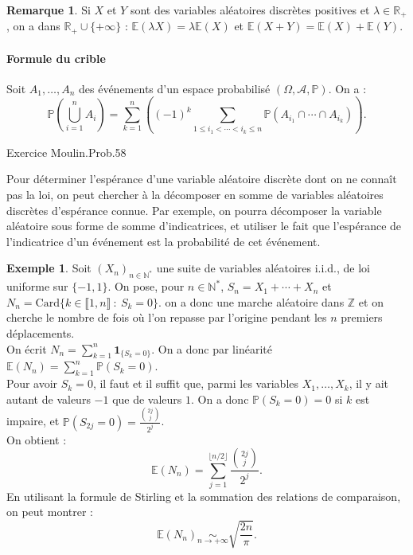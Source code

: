 \documentclass[french]{article}
\renewcommand{\P}{\mathbb{P}}
\newcommand{\N}{\mathbb{N}}
\newcommand{\Z}{\mathbb{Z}}
\newcommand{\R}{\mathbb{R}}
\newcommand{\st}{^*}
\newcommand{\E}{\mathbb{E}}
\newcommand{\card}{\text{Card}}
\theoremstyle{plain}
\theoremstyle{definition}
\newtheorem*{ex}{Exemple}
\newtheorem*{rmq}{Remarque}
\theoremstyle{remark}
\begin{document}
\begin{rmq}
	Si $X$ et $Y$ sont des variables aléatoires discrètes positives et $\lambda\in\R_+$, on a dans $\R_+\cup\{+\infty\}$ : $\E(\lambda X)=\lambda\E(X)$ et $\E(X+Y)=\E(X)+\E(Y)$.
\end{rmq}

\paragraph{Formule du crible}
Soit $A_1,\ldots,A_n$ des événements d'un espace probabilisé $(\Omega,\mathcal{A},\P)$. On a :
$$\P\left(\bigcup_{i=1}^nA_i\right)=\sum_{k=1}^{n}\left((-1)^k\sum_{1\leqslant i_1<\cdots<i_k\leqslant n}\P(A_{i_1}\cap\cdots\cap A_{i_k})\right).$$

Exercice Moulin.Prob.58

\begin{met}
	Pour déterminer l'espérance d'une variable aléatoire discrète dont on ne connaît pas la loi, on peut chercher à la décomposer en somme de variables aléatoires discrètes d'espérance connue. Par exemple, on pourra décomposer la variable aléatoire sous forme de somme d'indicatrices, et utiliser le fait que l'espérance de l'indicatrice d'un événement est la probabilité de cet événement.
\end{met}

\begin{ex}
	Soit $(X_n)_{n\in\N\st}$ une suite de variables aléatoires i.i.d., de loi uniforme sur $\{-1,1\}$. On pose, pour $n\in\N\st$, $S_n=X_1+\cdots+X_n$ et $N_n=\card\{k\in\llbracket1,n\rrbracket\ : \ S_k=0\}$. on a donc une marche aléatoire dans $\Z$ et on cherche le nombre de fois où l'on repasse par l'origine pendant les $n$ premiers déplacements.\\
	On écrit $N_n=\displaystyle\sum_{k=1}^{n}\textbf{1}_{\{S_k=0\}}$. On a donc par linéarité $\E(N_n)=\displaystyle\sum_{k=1}^{n}\P(S_k=0)$.\\
	Pour avoir $S_k=0$, il faut et il suffit que, parmi les variables $X_1,\ldots,X_k$, il y ait autant de valeurs $-1$ que de valeurs $1$. On a donc $\P(S_k=0)=0$ si $k$ est impaire, et $\P(S_{2j}=0)=\displaystyle\frac{\binom{2j}{j}}{2^j}$. \\
	On obtient :
	$$\E(N_n)=\sum_{j=1}^{\lfloor n/2\rfloor}\frac{\binom{2j}{j}}{2^j}.$$ En utilisant la formule de Stirling et la sommation des relations de comparaison, on peut montrer : $$\E(N_n)\underset{n\to+\infty}{\sim}\sqrt{\frac{2n}{\pi}}.$$
\end{ex}
\end{document}

